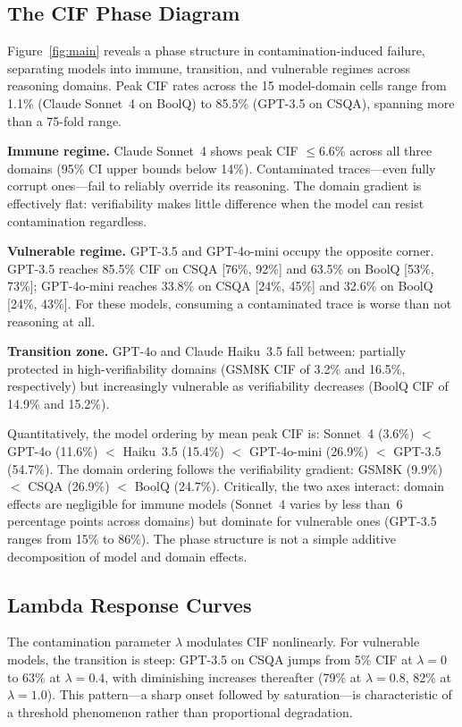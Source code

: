 \documentclass[aps,prx,reprint,twocolumn,superscriptaddress,longbibliography]{revtex4-2}
\begin{document}
\subsection{The CIF Phase Diagram}

Figure~\ref{fig:main} reveals a phase structure in contamination-induced failure, separating models into immune, transition, and vulnerable regimes across reasoning domains. Peak CIF rates across the 15 model-domain cells range from 1.1\% (Claude Sonnet~4 on BoolQ) to 85.5\% (GPT-3.5 on CSQA), spanning more than a 75-fold range.

\textbf{Immune regime.}
Claude Sonnet~4 shows peak CIF $\leq$6.6\% across all three domains (95\% CI upper bounds below 14\%). Contaminated traces---even fully corrupt ones---fail to reliably override its reasoning. The domain gradient is effectively flat: verifiability makes little difference when the model can resist contamination regardless.

\textbf{Vulnerable regime.}
GPT-3.5 and GPT-4o-mini occupy the opposite corner. GPT-3.5 reaches 85.5\% CIF on CSQA [76\%, 92\%] and 63.5\% on BoolQ [53\%, 73\%]; GPT-4o-mini reaches 33.8\% on CSQA [24\%, 45\%] and 32.6\% on BoolQ [24\%, 43\%]. For these models, consuming a contaminated trace is worse than not reasoning at all.

\textbf{Transition zone.}
GPT-4o and Claude Haiku~3.5 fall between: partially protected in high-verifiability domains (GSM8K CIF of 3.2\% and 16.5\%, respectively) but increasingly vulnerable as verifiability decreases (BoolQ CIF of 14.9\% and 15.2\%).

Quantitatively, the model ordering by mean peak CIF is: Sonnet~4 (3.6\%) $<$ GPT-4o (11.6\%) $<$ Haiku~3.5 (15.4\%) $<$ GPT-4o-mini (26.9\%) $<$ GPT-3.5 (54.7\%). The domain ordering follows the verifiability gradient: GSM8K (9.9\%) $<$ CSQA (26.9\%) $<$ BoolQ (24.7\%). Critically, the two axes interact: domain effects are negligible for immune models (Sonnet~4 varies by less than~6 percentage points across domains) but dominate for vulnerable ones (GPT-3.5 ranges from 15\% to 86\%). The phase structure is not a simple additive decomposition of model and domain effects.

\subsection{Lambda Response Curves}

The contamination parameter $\lambda$ modulates CIF nonlinearly. For vulnerable models, the transition is steep: GPT-3.5 on CSQA jumps from 5\% CIF at $\lambda=0$ to 63\% at $\lambda=0.4$, with diminishing increases thereafter (79\% at $\lambda=0.8$, 82\% at $\lambda=1.0$). This pattern---a sharp onset followed by saturation---is characteristic of a threshold phenomenon rather than proportional degradation.
\end{document}
